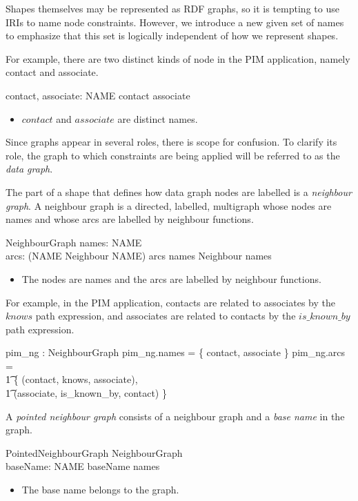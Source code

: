 \documentclass{article}
\begin{document}
Shapes themselves may be represented as RDF graphs, so it is tempting to use IRIs to name node constraints.
However, we introduce a new given set of names to emphasize that this set is logically independent of how we represent shapes.
\begin{zed}
	[NAME]
\end{zed}

For example, there are two distinct kinds of node in the PIM application, namely contact and associate.
\begin{axdef}
	contact, associate: NAME
\where
	contact \neq associate
\end{axdef}
\begin{itemize}
\item $contact$ and $associate$ are distinct names.
\end{itemize}

Since graphs appear in several roles, there is scope for confusion.
To clarify its role, the graph to which constraints are being applied will be referred to as the {\em data graph}.

The part of a shape that defines how data graph nodes are labelled is a {\em neighbour graph}.
A neighbour graph is a directed, labelled, multigraph whose nodes are names and whose
arcs are labelled by neighbour functions.
\begin{schema}{NeighbourGraph}
	names: \finset NAME \\
	arcs: \finset (NAME \cross Neighbour \cross NAME)
\where
	arcs \subseteq names \cross Neighbour \cross names
\end{schema}
\begin{itemize}
\item The nodes are names and the arcs are labelled by neighbour functions.
\end{itemize}

For example, in the PIM application, contacts are related to associates by the $knows$ path expression, and associates
are related to contacts by the $is\_known\_by$ path expression.
\begin{axdef}
	pim\_ng : NeighbourGraph
\where
	pim\_ng.names = \{ contact, associate \}
\also
	pim\_ng.arcs = \\
\t1		\{ (contact, knows, associate), \\
\t1		(associate, is\_known\_by, contact) \}
\end{axdef}

A {\em pointed neighbour graph} consists of a neighbour graph and a {\em base name} in the graph.
\begin{schema}{PointedNeighbourGraph}
	NeighbourGraph \\
	baseName: NAME
\where
	baseName \in names
\end{schema}
\begin{itemize}
\item The base name belongs to the graph.
\end{itemize}
\end{document}
